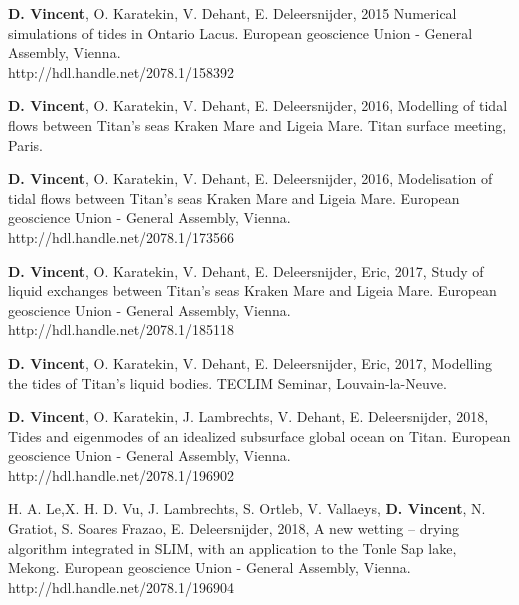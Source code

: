 \begin{list}{}{%
\setlength{\topsep}{0pt}%
\setlength{\leftmargin}{0.23in}%
\setlength{\listparindent}{-0.23in}%
\setlength{\itemindent}{-0.23in}%
\setlength{\parsep}{\parskip}%
}%

\item \textbf{D. Vincent}, O. Karatekin, V. Dehant, E. Deleersnijder, 2015 Numerical simulations of tides in Ontario Lacus. European geoscience Union - General Assembly, Vienna. \\http://hdl.handle.net/2078.1/158392

\item \textbf{D. Vincent}, O. Karatekin, V. Dehant, E. Deleersnijder, 2016, Modelling of tidal flows between Titan's seas Kraken Mare and Ligeia Mare. Titan surface meeting, Paris.

\item \textbf{D. Vincent}, O. Karatekin, V. Dehant, E. Deleersnijder, 2016, Modelisation of tidal flows between Titan's seas Kraken Mare and Ligeia Mare. European geoscience Union - General Assembly, Vienna.\\
http://hdl.handle.net/2078.1/173566

\item \textbf{D. Vincent}, O. Karatekin, V. Dehant, E. Deleersnijder, Eric, 2017, Study of liquid exchanges between Titan's seas Kraken Mare and Ligeia Mare. European geoscience Union - General Assembly, Vienna. \\
http://hdl.handle.net/2078.1/185118

\item \textbf{D. Vincent}, O. Karatekin, V. Dehant, E. Deleersnijder, Eric, 2017, Modelling the tides of Titan's liquid bodies. TECLIM Seminar, Louvain-la-Neuve.

\item \textbf{D. Vincent}, O. Karatekin, J. Lambrechts, V. Dehant, E. Deleersnijder, 2018, Tides and eigenmodes of an idealized subsurface global ocean on Titan. European geoscience Union - General Assembly, Vienna. \\
http://hdl.handle.net/2078.1/196902

\item H. A. Le,X. H. D. Vu, J. Lambrechts, S. Ortleb, V. Vallaeys, \textbf{D. Vincent}, N. Gratiot, S. Soares Frazao, E. Deleersnijder, 2018, A new wetting – drying algorithm integrated in SLIM, with an application to the Tonle Sap lake, Mekong. European geoscience Union - General Assembly, Vienna.\\ http://hdl.handle.net/2078.1/196904







\end{list}
